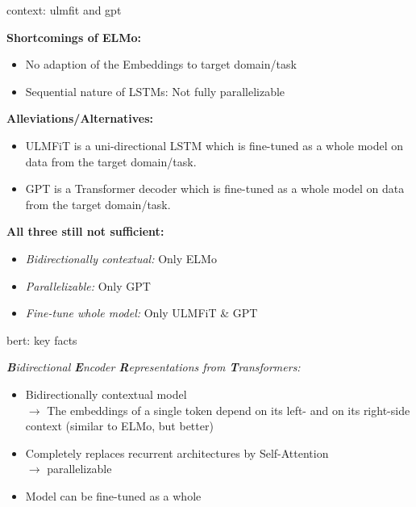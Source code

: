 \documentclass[11pt,compress,t,notes=noshow, xcolor=table]{beamer}
\begin{document}
\begin{frame}{context: ulmfit and gpt}

\vfill

	\textbf{Shortcomings of ELMo:}

	\begin{itemize}
		\item No adaption of the Embeddings to target domain/task
		\item Sequential nature of LSTMs: Not fully parallelizable 
	\end{itemize}
	
	\textbf{Alleviations/Alternatives:}

	\begin{itemize}
		\item ULMFiT  is a uni-directional LSTM which is fine-tuned as a whole model on data from the target domain/task.
		\item GPT  is a Transformer decoder which is fine-tuned as a whole model on data from the target domain/task.
	\end{itemize}
	
	\textbf{All three still not sufficient:}

	\begin{itemize}
		\item \textit{Bidirectionally contextual:} Only ELMo 
		\item \textit{Parallelizable:} Only GPT
		\item \textit{Fine-tune whole model:} Only ULMFiT \& GPT
	\end{itemize}
	
\vfill


\end{frame}


\begin{frame}{bert: key facts}

\vfill

\textit{\textbf{B}idirectional \textbf{E}ncoder \textbf{R}epresentations from \textbf{T}ransformers:}

\vspace{.5cm}

\begin{itemize}
		\item Bidirectionally contextual model\\
					$\to$ The embeddings of a single token depend on its left- and on its right-side context (similar to ELMo, but better)
		\item Completely replaces recurrent architectures by Self-Attention\\
					$\to$ parallelizable
		\item Model can be fine-tuned as a whole
\end{itemize}

\vfill

\end{frame}
\end{document}
